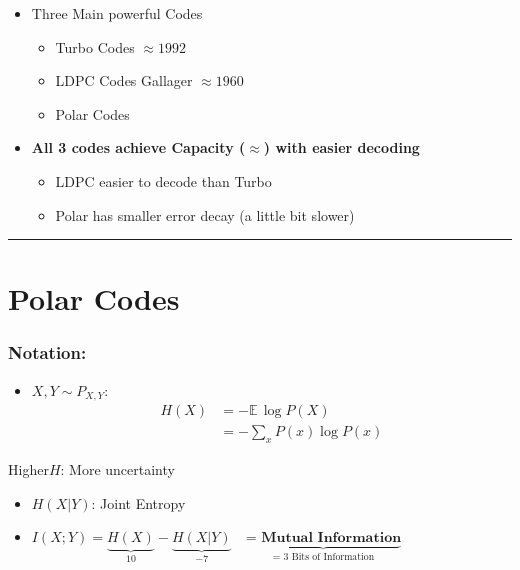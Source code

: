 \documentclass[11pt]{article}
\providecommand{\tightlist}{%
      \setlength{\itemsep}{0pt}\setlength{\parskip}{0pt}}
\begin{document}
    \begin{itemize}
\tightlist
\item
  Three Main powerful Codes

  \begin{itemize}
  \tightlist
  \item
    Turbo Codes \(\approx 1992\)
  \item
    LDPC Codes Gallager \(\approx 1960\)
  \item
    Polar Codes
  \end{itemize}
\item
  \textbf{All 3 codes achieve Capacity (\(\approx\)) with easier
  decoding}

  \begin{itemize}
  \tightlist
  \item
    LDPC easier to decode than Turbo
  \item
    Polar has smaller error decay (a little bit slower)
  \end{itemize}
\end{itemize}

\begin{center}\rule{0.5\linewidth}{0.5pt}\end{center}

    \section{\texorpdfstring{\textbf{Polar
Codes}}{Polar Codes}}\label{polar-codes}

\subsubsection{Notation:}\label{notation}

\begin{itemize}
\tightlist
\item
  \(X, Y \sim P_{X, Y}\): \[\begin{align}
      H(X) &= -\mathbb{E} \, \log P(X) \\
           &= -\sum_x P(x) \log P(x)
           \end{align}
  \]
\end{itemize}

Higher\(H\): More uncertainty

\begin{itemize}
\tightlist
\item
  \(H(X | Y)\): Joint Entropy
\item
  \(I(X; Y) = \underbrace{H(X)}_{10} - \underbrace{H(X | Y)}_{ - 7} \quad \underbrace{\textbf{= Mutual Information}}_\text{= 3 Bits of Information}\)
\end{itemize}
\end{document}

